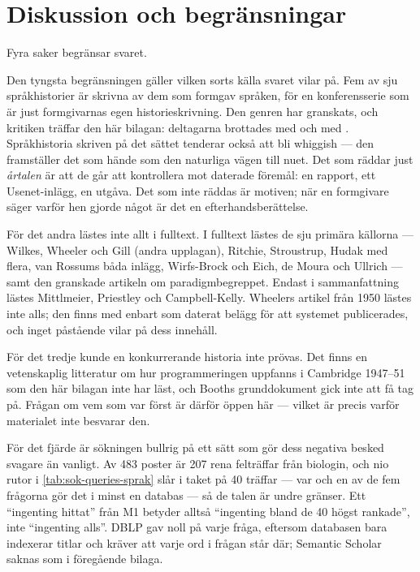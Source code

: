 \section{Diskussion och begränsningar}
\label{sec:sprak-diskussion}

Fyra saker begränsar svaret.

Den tyngsta begränsningen gäller vilken sorts källa svaret vilar på.  Fem
av sju språkhistorier är skrivna av dem som formgav språken, för en
konferensserie som är just formgivarnas egen historieskrivning.  Den
genren har granskats, och kritiken träffar den här bilagan: deltagarna
brottades med
 och
med .  Språkhistoria skriven på det sättet
tenderar också att bli
\foreignlanguage{english}{whiggish}\autocite{Priestley2008Logic} --- den
framställer det som hände som den naturliga vägen till nuet.  Det som
räddar just \emph{årtalen} är att de går att kontrollera mot daterade
föremål: en rapport, ett Usenet-inlägg, en utgåva.  Det som inte räddas är
motiven; när en formgivare säger varför hen gjorde något är det en
efterhandsberättelse.

För det andra lästes inte allt i fulltext.  I fulltext lästes de sju
primära källorna --- Wilkes, Wheeler och Gill (andra upplagan), Ritchie,
Stroustrup,
Hudak med flera, van Rossums båda inlägg, Wirfs-Brock och Eich, de Moura
och Ullrich --- samt den granskade artikeln om paradigmbegreppet.  Endast i
sammanfattning lästes Mittlmeier, Priestley och Campbell-Kelly.
Wheelers artikel från 1950 lästes inte alls; den finns
med enbart som daterat belägg för att systemet publicerades, och inget
påstående vilar på dess innehåll.

För det tredje kunde en konkurrerande historia inte prövas.  Det finns en
vetenskaplig litteratur om hur programmeringen uppfanns i Cambridge
1947--51\autocite{CampbellKelly2011Invention} som den här bilagan inte har
läst, och Booths grunddokument gick inte att få tag på.  Frågan om vem som
var först är därför öppen här --- vilket är precis varför materialet inte
besvarar den.

För det fjärde är sökningen bullrig på ett sätt som gör dess negativa
besked svagare än vanligt.  Av 483 poster är 207 rena felträffar från
biologin, och nio rutor i \cref{tab:sok-queries-sprak} slår i taket på 40
träffar --- var och en av de fem frågorna gör det i minst en databas ---
så de talen är undre gränser.  Ett \enquote{ingenting
hittat} från M1 betyder alltså \enquote{ingenting bland de 40 högst
rankade}, inte \enquote{ingenting alls}.  DBLP gav noll på varje fråga,
eftersom databasen bara indexerar titlar och kräver att varje ord i frågan
står där; Semantic Scholar saknas som i föregående bilaga.


